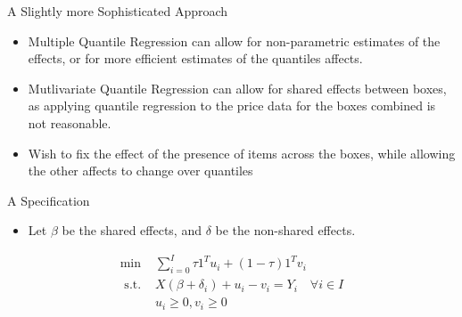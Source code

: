 \documentclass[bigger]{beamer}
\begin{document}
\begin{frame}[label=sec-1-25]{A Slightly more Sophisticated Approach}
\begin{itemize}
\item Multiple Quantile Regression can allow for non-parametric estimates
of the effects, or for more efficient estimates of the quantiles
affects.
\item Mutlivariate Quantile Regression can allow for shared effects
between boxes, as applying quantile regression to the price data for
the boxes combined is not reasonable.
\item Wish to fix the effect of the presence of items across the boxes,
while allowing the other affects to change over quantiles
\end{itemize}
\end{frame}

\begin{frame}[label=sec-1-26]{A Specification}
\begin{itemize}
\item Let $\beta$ be the shared effects, and $\delta$ be the non-shared effects.
\end{itemize}
\begin{align*}
\min & \sum_{i=0}^I \tau 1^T u_i + (1-\tau) 1^T v_i \\
\text{ s.t. } &X ( \beta + \delta_i ) + u_i - v_i = Y_i \quad \forall i \in I\\
&u_i \geq 0, v_i \geq 0\\
\end{align*}
\end{frame}
\end{document}
